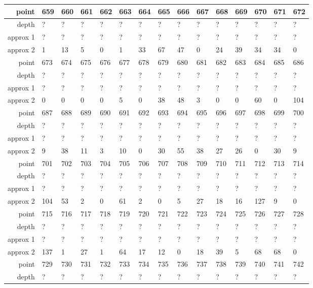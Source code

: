 \begin{center}
\begin{supertabular}{|r|l l l l l l l l l l l l l l|}
\hline
point & 659 & 660 & 661 & 662 & 663 & 664 & 665 & 666 & 667 & 668 & 669 & 670 & 671 & 672 \\
\hline
depth & ? & ? & ? & ? & ? & ? & ? & ? & ? & ? & ? & ? & ? & ? \\
approx 1 & ? & ? & ? & ? & ? & ? & ? & ? & ? & ? & ? & ? & ? & ? \\
approx 2 & 1 & 13 & 5 & 0 & 1 & 33 & 67 & 47 & 0 & 24 & 39 & 34 & 34 & 0 \\
\hline
point & 673 & 674 & 675 & 676 & 677 & 678 & 679 & 680 & 681 & 682 & 683 & 684 & 685 & 686 \\
\hline
depth & ? & ? & ? & ? & ? & ? & ? & ? & ? & ? & ? & ? & ? & ? \\
approx 1 & ? & ? & ? & ? & ? & ? & ? & ? & ? & ? & ? & ? & ? & ? \\
approx 2 & 0 & 0 & 0 & 0 & 5 & 0 & 38 & 48 & 3 & 0 & 0 & 60 & 0 & 104 \\
\hline
point & 687 & 688 & 689 & 690 & 691 & 692 & 693 & 694 & 695 & 696 & 697 & 698 & 699 & 700 \\
\hline
depth & ? & ? & ? & ? & ? & ? & ? & ? & ? & ? & ? & ? & ? & ? \\
approx 1 & ? & ? & ? & ? & ? & ? & ? & ? & ? & ? & ? & ? & ? & ? \\
approx 2 & 9 & 38 & 11 & 3 & 10 & 0 & 30 & 55 & 38 & 27 & 26 & 0 & 30 & 9 \\
\hline
point & 701 & 702 & 703 & 704 & 705 & 706 & 707 & 708 & 709 & 710 & 711 & 712 & 713 & 714 \\
\hline
depth & ? & ? & ? & ? & ? & ? & ? & ? & ? & ? & ? & ? & ? & ? \\
approx 1 & ? & ? & ? & ? & ? & ? & ? & ? & ? & ? & ? & ? & ? & ? \\
approx 2 & 104 & 53 & 2 & 0 & 61 & 2 & 0 & 5 & 27 & 18 & 16 & 127 & 9 & 0 \\
\hline
point & 715 & 716 & 717 & 718 & 719 & 720 & 721 & 722 & 723 & 724 & 725 & 726 & 727 & 728 \\
\hline
depth & ? & ? & ? & ? & ? & ? & ? & ? & ? & ? & ? & ? & ? & ? \\
approx 1 & ? & ? & ? & ? & ? & ? & ? & ? & ? & ? & ? & ? & ? & ? \\
approx 2 & 137 & 1 & 27 & 1 & 64 & 17 & 12 & 0 & 18 & 39 & 5 & 68 & 68 & 0 \\
\hline
point & 729 & 730 & 731 & 732 & 733 & 734 & 735 & 736 & 737 & 738 & 739 & 740 & 741 & 742 \\
\hline
depth & ? & ? & ? & ? & ? & ? & ? & ? & ? & ? & ? & ? & ? & ? \\

\end{supertabular}
\end{center}
